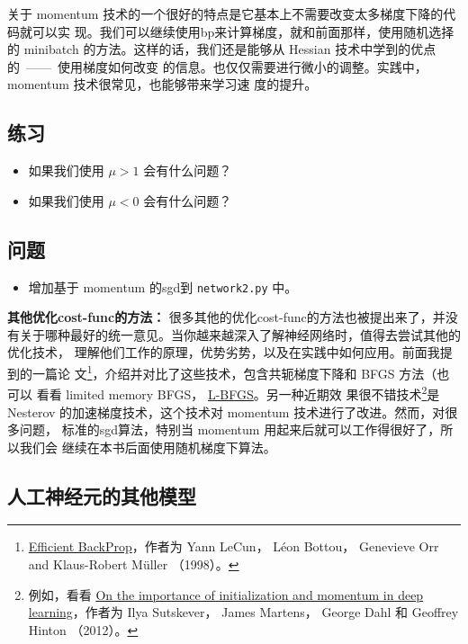 关于 momentum 技术的一个很好的特点是它基本上不需要改变太多梯度下降的代码就可以实
现。我们可以继续使用\gls*{bp}来计算梯度，就和前面那样，使用随机选择的 minibatch
的方法。这样的话，我们还是能够从 Hessian 技术中学到的优点的~——~使用梯度如何改变
的信息。也仅仅需要进行微小的调整。实践中，momentum 技术很常见，也能够带来学习速
度的提升。

\subsection*{练习}

\begin{itemize}
\item 如果我们使用 $\mu > 1$ 会有什么问题？
\item 如果我们使用 $\mu < 0$ 会有什么问题？
\end{itemize}

\subsection*{问题}

\begin{itemize}
\item 增加基于 momentum 的\gls*{sgd}到 \lstinline!network2.py! 中。
\end{itemize}

\textbf{其他优化\gls*{cost-func}的方法：} 很多其他的优化\gls*{cost-func}的方法也被提出来了，并没
有关于哪种最好的统一意见。当你越来越深入了解神经网络时，值得去尝试其他的优化技术，
理解他们工作的原理，优势劣势，以及在实践中如何应用。前面我提到的一篇论
文\footnote{\href{http://yann.lecun.com/exdb/publis/pdf/lecun-98b.pdf}{Efficient
    BackProp}，作者为 Yann LeCun， Léon Bottou， Genevieve Orr and Klaus-Robert
  Müller （1998）。}，介绍并对比了这些技术，包含共轭梯度下降和 BFGS 方法（也可以
  看看 limited memory BFGS，
  \href{http://en.wikipedia.org/wiki/Limited-memory_BFGS}{L-BFGS}。另一种近期效
  果很不错技术\footnote{例如，看看
    \href{http://www.cs.toronto.edu/~hinton/absps/momentum.pdf}{On the
      importance of initialization and momentum in deep learning}，作者为 Ilya
    Sutskever， James Martens， George Dahl 和 Geoffrey Hinton （2012）。}是
  Nesterov 的加速梯度技术，这个技术对 momentum 技术进行了改进。然而，对很多问题，
  标准的\gls*{sgd}算法，特别当 momentum 用起来后就可以工作得很好了，所以我们会
  继续在本书后面使用随机梯度下算法。

\subsection{人工神经元的其他模型}
\label{subsec:other_models_of_artificial_neuron}

